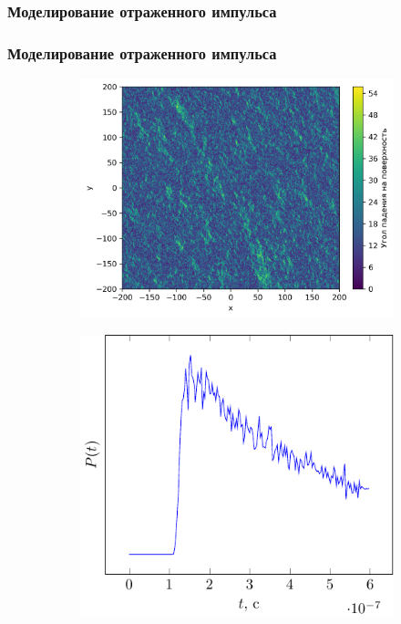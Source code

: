 \documentclass[10pt,pdf,hyperref={unicode}, dvipsnames]{beamer}
\begin{document}
\begin{frame}[t]
	\frametitle{Моделирование отраженного импульса}
    \begin{figure}[h]
        \begin{subfigure}{\linewidth}
            \centering
            \def\svgwidth{0.8\linewidth}
            
        \end{subfigure}
    \end{figure}
\end{frame}
\begin{frame}[t]
	\frametitle{Моделирование отраженного импульса}
    \begin{figure}[h]
        \begin{subfigure}{0.60\linewidth}
            \centering
            \includegraphics[width=\linewidth]{img/theta0}
        \end{subfigure}
        \begin{subfigure}{0.39\linewidth}
            \centering
            \includegraphics[width=\linewidth]{fig/theta}
        \end{subfigure}
    \end{figure}
\end{frame}
\end{document}
